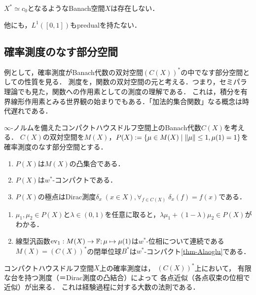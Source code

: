 \documentclass[uplatex,dvipdfmx]{jsreport}
\begin{document}
\begin{corollary}\label{cor-predual-of-c0}
    $X^*\simeq c_0$となるようなBanach空間$X$は存在しない．
\end{corollary}
\begin{remark}
    他にも，$L^1([0,1])$もpredualを持たない．
\end{remark}

\subsection{確率測度のなす部分空間}

\begin{tcolorbox}[colframe=ForestGreen, colback=ForestGreen!10!white,breakable,colbacktitle=ForestGreen!40!white,coltitle=black,fonttitle=\bfseries\sffamily,
title=]
    例として，確率測度がBanach代数の双対空間$(C(X))^*$の中でなす部分空間としての性質を見る．
    測度を，関数の双対空間の元と考える．つまり，セミパラ理論でも見た，関数への作用素としての測度の理解である．
    これは，積分を有界線形作用素とみる世界観の始まりでもある．「加法的集合関数」なる概念は時代遅れである．
\end{tcolorbox}

\begin{proposition}
    $\infty$-ノルムを備えたコンパクトハウスドルフ空間上のBanach代数$C(X)$を考える．
    $C(X)$の双対空間を$M(X)$，$P(X):=\left\{\mu\in M(X)\mid\|\mu\|\le 1,\mu(1)=1\right\}$を確率測度のなす部分空間とする．
    \begin{enumerate}
        \item $P(X)$は$M(X)$の凸集合である．
        \item $P(X)$は$w^*$-コンパクトである．
        \item $P(X)$の極点はDirac測度$\delta_x\;(x\in X),\forall_{f\in C(X)}\;\delta_x(f)=f(x)$である．
    \end{enumerate}
\end{proposition}
\begin{Proof}\mbox{}
    \begin{enumerate}
        \item $\mu_1,\mu_2\in P(X)$と$\lambda\in(0,1)$を任意に取ると，$\lambda\mu_1+(1-\lambda)\mu_2\in P(X)$がわかる．
        \item 線型汎函数$\mathrm{ev}_1:M(X)\to\mathbb{F};\mu\mapsto\mu(1)$は$w^*$-位相について連続である
        $M(X)=(C(X))^*$の閉単位球$B^*$は$w^*$-コンパクト\ref{thm-Alaoglu}である．
    \end{enumerate}
\end{Proof}
\begin{remarks}
    コンパクトハウスドルフ空間$X$上の確率測度は，
    $(C(X))^*$上において，
    有限な台を持つ測度（＝Dirac測度の凸結合）によって
    各点近似（各点収束の位相で近似）が出来る．
    これは経験過程に対する大数の法則である．
\end{remarks}
\end{document}
